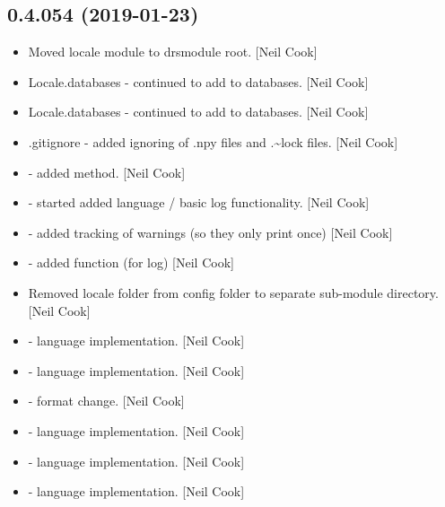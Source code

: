\documentclass[a4paper,10pt,english]{report}
\begin{document}
\subsection{0.4.054 (2019-01-23)}
\label{\detokenize{misc/changelog:id209}}\begin{itemize}
\item {} 
Moved locale module to drsmodule root. {[}Neil Cook{]}

\item {} 
Locale.databases - continued to add to databases. {[}Neil Cook{]}

\item {} 
Locale.databases - continued to add to databases. {[}Neil Cook{]}

\item {} 
.gitignore - added ignoring of .npy files and .\textasciitilde{}lock files. {[}Neil
Cook{]}

\item {} 
 - added  method. {[}Neil
Cook{]}

\item {} 
 - started added language / basic log
functionality. {[}Neil Cook{]}

\item {} 
 - added tracking of warnings (so
they only print once) {[}Neil Cook{]}

\item {} 
 - added  function (for log) {[}Neil
Cook{]}

\item {} 
Removed locale folder from config folder to separate sub-module
directory. {[}Neil Cook{]}

\item {} 
 - language implementation.
{[}Neil Cook{]}

\item {} 
 - language implementation.
{[}Neil Cook{]}

\item {} 
 - format change. {[}Neil Cook{]}

\item {} 
 - language implementation. {[}Neil Cook{]}

\item {} 
 - language implementation. {[}Neil Cook{]}

\item {} 
 - language implementation. {[}Neil Cook{]}

\end{itemize}
\end{document}
